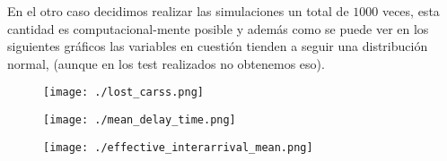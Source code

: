 \documentclass[14pt]{extarticle}
\begin{document}
En el otro caso decidimos realizar las simulaciones un total de $1000$ veces, esta cantidad es computacional-mente posible y además como se puede ver en los siguientes gráficos las variables en cuestión tienden a seguir una distribución normal, (aunque en los test realizados no obtenemos eso).

\begin{figure}[htbp]
    \centering
    \texttt{[image: ./lost\_carss.png]}
  \end{figure}

  \begin{figure}[htbp]
    \centering
    \texttt{[image: ./mean\_delay\_time.png]}
  \end{figure}

  \begin{figure}[htbp]
    \centering
    \texttt{[image: ./effective\_interarrival\_mean.png]}
  \end{figure}
\end{document}
